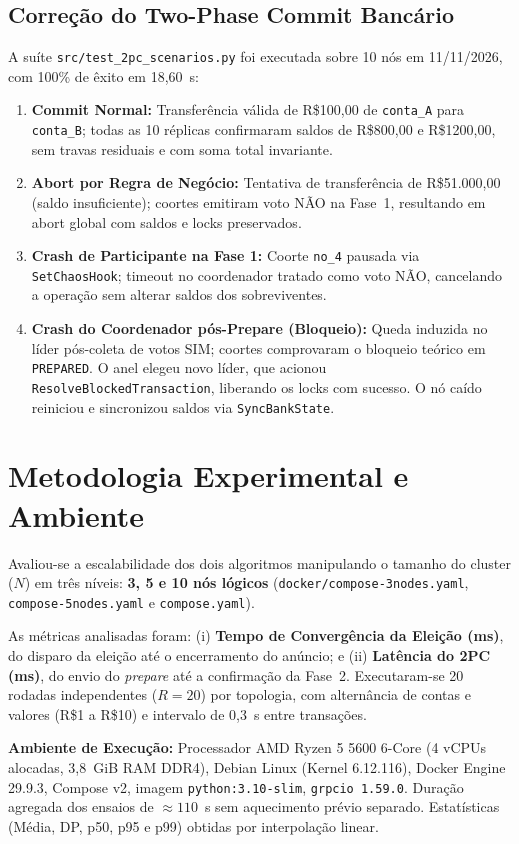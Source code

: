 \documentclass[conference]{IEEEtran}
\begin{document}
\subsection{Correção do Two-Phase Commit Bancário}
A suíte \texttt{src/test\_2pc\_scenarios.py} foi executada sobre 10 nós em 11/11/2026, com 100\% de êxito em 18,60~s:
\begin{enumerate}
  \item \textbf{Commit Normal:} Transferência válida de R\$100,00 de \texttt{conta\_A} para \texttt{conta\_B}; todas as 10 réplicas confirmaram saldos de R\$800,00 e R\$1200,00, sem travas residuais e com soma total invariante.
  \item \textbf{Abort por Regra de Negócio:} Tentativa de transferência de R\$51.000,00 (saldo insuficiente); coortes emitiram voto NÃO na Fase~1, resultando em abort global com saldos e locks preservados.
  \item \textbf{Crash de Participante na Fase 1:} Coorte \texttt{no\_4} pausada via \texttt{SetChaosHook}; timeout no coordenador tratado como voto NÃO, cancelando a operação sem alterar saldos dos sobreviventes.
  \item \textbf{Crash do Coordenador pós-Prepare (Bloqueio):} Queda induzida no líder pós-coleta de votos SIM; coortes comprovaram o bloqueio teórico em \texttt{PREPARED}. O anel elegeu novo líder, que acionou \texttt{ResolveBlockedTransaction}, liberando os locks com sucesso. O nó caído reiniciou e sincronizou saldos via \texttt{SyncBankState}.
\end{enumerate}

\section{Metodologia Experimental e Ambiente}
Avaliou-se a escalabilidade dos dois algoritmos manipulando o tamanho do cluster ($N$) em três níveis: \textbf{3, 5 e 10 nós lógicos} (\texttt{docker/compose-3nodes.yaml}, \texttt{compose-5nodes.yaml} e \texttt{compose.yaml}).

As métricas analisadas foram: (i) \textbf{Tempo de Convergência da Eleição (ms)}, do disparo da eleição até o encerramento do anúncio; e (ii) \textbf{Latência do 2PC (ms)}, do envio do \textit{prepare} até a confirmação da Fase~2. Executaram-se 20 rodadas independentes ($R=20$) por topologia, com alternância de contas e valores (R\$1 a R\$10) e intervalo de 0,3~s entre transações.

\textbf{Ambiente de Execução:} Processador AMD Ryzen 5 5600 6-Core (4 vCPUs alocadas, 3,8~GiB RAM DDR4), Debian Linux (Kernel 6.12.116), Docker Engine 29.9.3, Compose v2, imagem \texttt{python:3.10-slim}, \texttt{grpcio 1.59.0}. Duração agregada dos ensaios de $\approx 110$~s sem aquecimento prévio separado. Estatísticas (Média, DP, p50, p95 e p99) obtidas por interpolação linear.
\end{document}
